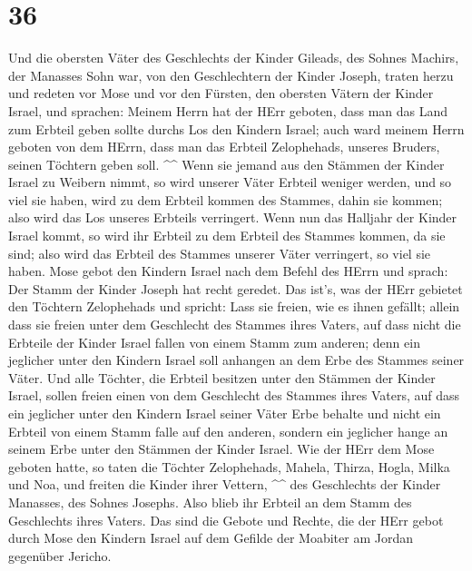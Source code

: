 \hypertarget{section-35}{%
\section{36}\label{section-35}}

 Und die obersten Väter des Geschlechts der Kinder
Gileads, des Sohnes Machirs, der Manasses Sohn war, von den
Geschlechtern der Kinder Joseph, traten herzu und redeten vor Mose und
vor den Fürsten, den obersten Vätern der Kinder Israel, 
und sprachen: Meinem Herrn hat der HErr geboten, dass man das Land zum
Erbteil geben sollte durchs Los den Kindern Israel; auch ward meinem
Herrn geboten von dem HErrn, dass man das Erbteil Zelophehads, unseres
Bruders, seinen Töchtern geben soll. \^{}\^{}  Wenn sie
jemand aus den Stämmen der Kinder Israel zu Weibern nimmt, so wird
unserer Väter Erbteil weniger werden, und so viel sie haben, wird zu dem
Erbteil kommen des Stammes, dahin sie kommen; also wird das Los unseres
Erbteils verringert.  Wenn nun das Halljahr der Kinder
Israel kommt, so wird ihr Erbteil zu dem Erbteil des Stammes kommen, da
sie sind; also wird das Erbteil des Stammes unserer Väter verringert, so
viel sie haben.  Mose gebot den Kindern Israel nach dem
Befehl des HErrn und sprach: Der Stamm der Kinder Joseph hat recht
geredet.  Das ist's, was der HErr gebietet den Töchtern
Zelophehads und spricht: Lass sie freien, wie es ihnen gefällt; allein
dass sie freien unter dem Geschlecht des Stammes ihres Vaters,
 auf dass nicht die Erbteile der Kinder Israel fallen von
einem Stamm zum anderen; denn ein jeglicher unter den Kindern Israel
soll anhangen an dem Erbe des Stammes seiner Väter.  Und
alle Töchter, die Erbteil besitzen unter den Stämmen der Kinder Israel,
sollen freien einen von dem Geschlecht des Stammes ihres Vaters, auf
dass ein jeglicher unter den Kindern Israel seiner Väter Erbe behalte
 und nicht ein Erbteil von einem Stamm falle auf den
anderen, sondern ein jeglicher hange an seinem Erbe unter den Stämmen
der Kinder Israel.  Wie der HErr dem Mose geboten hatte,
so taten die Töchter Zelophehads,  Mahela, Thirza, Hogla,
Milka und Noa, und freiten die Kinder ihrer Vettern, \^{}\^{}
 des Geschlechts der Kinder Manasses, des Sohnes Josephs.
Also blieb ihr Erbteil an dem Stamm des Geschlechts ihres Vaters.
 Das sind die Gebote und Rechte, die der HErr gebot durch
Mose den Kindern Israel auf dem Gefilde der Moabiter am Jordan gegenüber
Jericho.
